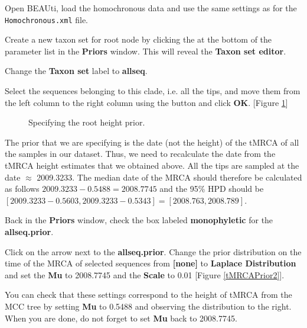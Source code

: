 \documentclass[11pt]{article}
\begin{document}
\begin{framed}
Open BEAUti, load the homochronous data and use the same settings as for the \texttt{Homochronous.xml} file.

Create a new taxon set for root node by clicking the \fbox{+} at the bottom of the parameter list in the \textbf{Priors} window. This will reveal the \textbf{Taxon set  editor}.

Change the \textbf{Taxon set} label to \textbf{allseq}.

Select the sequences belonging to this clade, i.e. all the tips, and move them from the left column to the right column using the \fbox{> >} button and click \textbf{OK}. [Figure \ref{tMRCAPrior}] 
\end{framed}

\begin{figure}[h!]
\centering
{}
\caption{\small Specifying the root height prior.}
\label{tMRCAPrior}
\end{figure}

The prior that we are specifying is the date (not the height) of the tMRCA of all the samples in our dataset. Thus, we need to recalculate the date from the tMRCA height estimates that we obtained above. All the tips are sampled at the date $\approx$ 2009.3233. The median date of the MRCA should therefore be calculated as follows $2009.3233-0.5488 = 2008.7745$ and the 95\% HPD should be $[2009.3233-0.5603,2009.3233-0.5343]=[2008.763,2008.789]$.

\begin{framed}
Back in the \textbf{Priors} window, check the box labeled \textbf{monophyletic} for the \textbf{allseq.prior}.

Click on the arrow next to the \textbf{allseq.prior}. Change the prior distribution on the time of the MRCA of selected sequences from \textbf{[none]} to \textbf{Laplace Distribution} and set the \textbf{Mu} to 2008.7745 and the \textbf{Scale} to 0.01 [Figure \ref{tMRCAPrior2}]. 

You can check that these settings correspond to the height of tMRCA from the MCC tree by setting \textbf{Mu} to 0.5488 and observing the distribution to the right. When you are done, do not forget to set \textbf{Mu} back to 2008.7745.
\end{framed}
\end{document}
